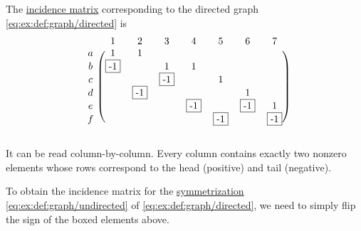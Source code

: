 \begin{example}\label{ex:def:graph_matrices}
  The \hyperref[def:graph_matrices/incidence]{incidence matrix} corresponding to the directed graph \eqref{eq:ex:def:graph/directed} is
  \begin{equation}\label{ex:def:graph_matrices/incidence}
    \begin{blockarray}{cccccccc}
        & 1         & 2         & 3         & 4         & 5         & 6         & 7         \\
      \begin{block}{c(ccccccc)}
      a & 1         & 1         &           &           &           &           &           \\
      b & \fbox{-1} &           & 1         & 1         &           &           &           \\
      c &           &           & \fbox{-1} &           & 1         &           &           \\
      d &           & \fbox{-1} &           &           &           & 1         &           \\
      e &           &           &           & \fbox{-1} &           & \fbox{-1} & 1         \\
      f &           &           &           &           & \fbox{-1} &           & \fbox{-1} \\
      \end{block}
    \end{blockarray}
  \end{equation}

  It can be read column-by-column. Every column contains exactly two nonzero elements whose rows correspond to the head (positive) and tail (negative).

  To obtain the incidence matrix for the \hyperref[def:graph/symmetrization]{symmetrization} \eqref{eq:ex:def:graph/undirected} of \eqref{eq:ex:def:graph/directed}, we need to simply flip the sign of the boxed elements above.


\end{example}
